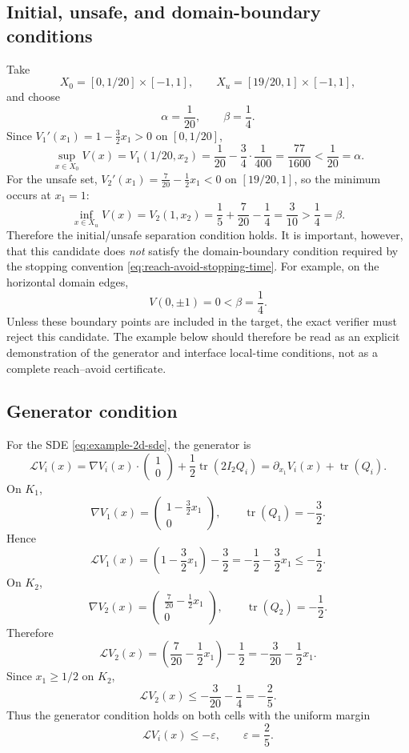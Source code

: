 \documentclass[10pt]{extarticle}
\begin{document}
\subsection{Initial, unsafe, and domain-boundary conditions}

Take
\[
  X_0=[0,1/20]\times[-1,1],
  \qquad
  X_u=[19/20,1]\times[-1,1],
\]
and choose
\[
  \alpha=\frac1{20},
  \qquad
  \beta=\frac14.
\]
Since $V_1'(x_1)=1-\frac32x_1>0$ on $[0,1/20]$,
\[
  \sup_{x\in X_0}V(x)
  =
  V_1(1/20,x_2)
  =
  \frac1{20}
  -\frac34\cdot\frac1{400}
  =
  \frac{77}{1600}
  <
  \frac1{20}
  =
  \alpha.
\]
For the unsafe set, $V_2'(x_1)=\frac{7}{20}-\frac12x_1<0$ on
$[19/20,1]$, so the minimum occurs at $x_1=1$:
\[
  \inf_{x\in X_u}V(x)
  =
  V_2(1,x_2)
  =
  \frac15+\frac{7}{20}-\frac14
  =
  \frac3{10}
  >
  \frac14
  =
  \beta.
\]
Therefore the initial/unsafe separation condition holds.  It is important,
however, that this candidate does \emph{not} satisfy the domain-boundary
condition required by the stopping convention
\eqref{eq:reach-avoid-stopping-time}.  For example, on the horizontal domain
edges,
\[
  V(0,\pm1)=0<\beta=\frac14.
\]
Unless these boundary points are included in the target, the exact verifier
must reject this candidate.  The example below should therefore be read as an
explicit demonstration of the generator and interface local-time conditions,
not as a complete reach--avoid certificate.

\subsection{Generator condition}

For the SDE \eqref{eq:example-2d-sde}, the generator is
\[
  \mathcal LV_i(x)
  =
  \nabla V_i(x)\cdot
  \begin{pmatrix}1\\0\end{pmatrix}
  +
  \frac12\operatorname{tr}(2I_2Q_i)
  =
  \partial_{x_1}V_i(x)+\operatorname{tr}(Q_i).
\]
On $K_1$,
\[
  \nabla V_1(x)=
  \begin{pmatrix}
    1-\frac32x_1\\0
  \end{pmatrix},
  \qquad
  \operatorname{tr}(Q_1)=-\frac32.
\]
Hence
\[
  \mathcal LV_1(x)
  =
  \left(1-\frac32x_1\right)-\frac32
  =
  -\frac12-\frac32x_1
  \leq
  -\frac12.
\]
On $K_2$,
\[
  \nabla V_2(x)=
  \begin{pmatrix}
    \frac{7}{20}-\frac12x_1\\0
  \end{pmatrix},
  \qquad
  \operatorname{tr}(Q_2)=-\frac12.
\]
Therefore
\[
  \mathcal LV_2(x)
  =
  \left(\frac{7}{20}-\frac12x_1\right)-\frac12
  =
  -\frac{3}{20}-\frac12x_1.
\]
Since $x_1\geq1/2$ on $K_2$,
\[
  \mathcal LV_2(x)
  \leq
  -\frac{3}{20}-\frac14
  =
  -\frac25.
\]
Thus the generator condition holds on both cells with the uniform margin
\[
  \mathcal LV_i(x)\leq-\varepsilon,
  \qquad
  \varepsilon=\frac25.
\]
\end{document}

